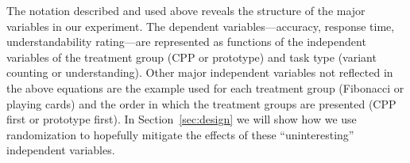 \documentclass[11pt]{article}
\begin{document}
The notation described and used above reveals the structure of the major
variables in our experiment.  The dependent variables---accuracy, response
time, understandability rating---are represented as functions of the
independent variables of the treatment group (CPP or prototype) and task type
(variant counting or understanding).  Other major independent variables not
reflected in the above equations are the example used for each treatment group
(Fibonacci or playing cards) and the order in which the treatment groups are
presented (CPP first or prototype first).  In Section~\ref{sec:design} we will
show how we use randomization to hopefully mitigate the effects of these
``uninteresting'' independent variables.

\end{document}
